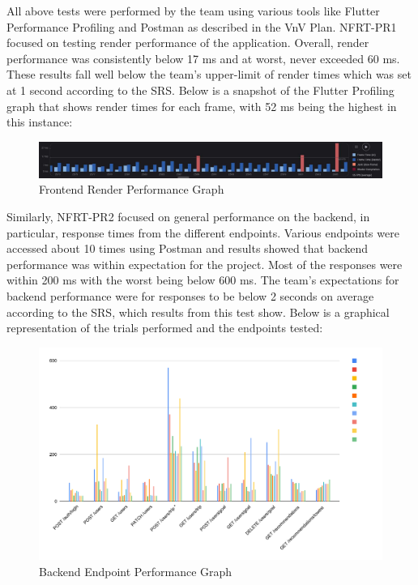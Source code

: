 \documentclass[12pt, titlepage]{article}
\begin{document}
All above tests were performed by the team using various tools like Flutter Performance Profiling and Postman
as described in the VnV Plan. NFRT-PR1 focused on testing render performance of the application. Overall, render
performance was consistently below 17 ms and at worst, never exceeded 60 ms. These results fall well below the team's
upper-limit of render times which was set at 1 second according to the SRS. Below is a snapshot of the Flutter Profiling graph that
shows render times for each frame, with 52 ms being the highest in this instance:

\begin{figure}[H]
  \centering
  \includegraphics[width=\textwidth]{frontend_performance_graph.pdf}
  \caption{Frontend Render Performance Graph}
  \label{fig:FrontendPerformanceGraph}
\end{figure}

Similarly, NFRT-PR2 focused on general performance on the backend, in particular, response times from the
different endpoints. Various endpoints were accessed about 10 times using Postman and results showed that
backend performance was within expectation for the project. Most of the responses were within 200 ms with the
worst being below 600 ms. The team's expectations for backend performance were for responses to be below 2 seconds
on average according to the SRS, which results from this test show. Below is a graphical representation of the
trials performed and the endpoints tested:

\begin{figure}[H]
  \centering
  \includegraphics[width=\textwidth]{backend_performance_graph.pdf}
  \caption{Backend Endpoint Performance Graph}
  \label{fig:BacendPerformanceGraph}
\end{figure}
\end{document}
